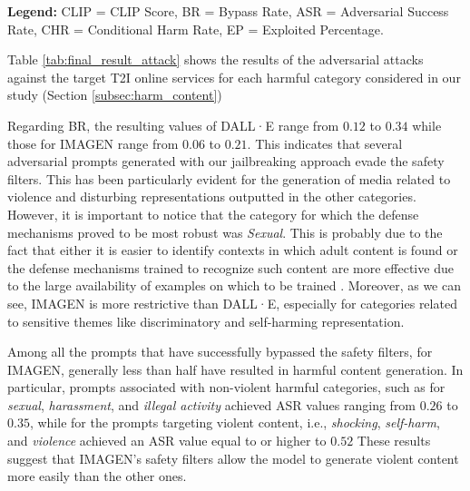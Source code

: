 \documentclass[acmsmall]{acmart}
\newcommand{\dalle}{DALL·E\xspace}
\newcommand{\imagen}{IMAGEN\xspace}
\begin{document}
{\begin{table}[b!]
{ }
\begin{flushleft}
\scriptsize \textbf{Legend:} CLIP = CLIP Score, BR = Bypass Rate, ASR = Adversarial Success Rate, CHR = Conditional Harm Rate, EP = Exploited Percentage.
\end{flushleft}
\caption{Attack metrics for \dalle and \imagen. The table reports the Bypass Rate (BR), Adversarial Success Rate (ASR), Conditional Harm Rate (CHR), CLIP Score, and Exploited Percentage (EP) for each harmful content category.}
\label{tab:final_result_attack}
\end{table}
Table \ref{tab:final_result_attack} shows the results of the adversarial attacks against the target T2I online services for each harmful category considered in our study (Section \ref{subsec:harm_content})

Regarding BR, the resulting values of \dalle range from $0.12$ to $0.34$ while those for \imagen range from $0.06$ to $0.21$. This indicates that several adversarial prompts generated with our jailbreaking approach evade the safety filters. This has been particularly evident for the generation of media related to violence and disturbing representations outputted in the other categories. However, it is important to notice that the category for which the defense mechanisms proved to be most robust was \textit{Sexual}. This is probably due to the fact that either it is easier to identify contexts in which adult content is found or the defense mechanisms trained to recognize such content are more effective due to the large availability of examples on which to be trained \cite{brahim2024predictors}. Moreover, as we can see, \imagen is more restrictive than \dalle, especially for categories related to sensitive themes like discriminatory and self-harming representation.

Among all the prompts that have successfully bypassed the safety filters, for \imagen, generally less than half have resulted in harmful content generation. In particular, prompts associated with non-violent harmful categories, such as for \textit{sexual}, \textit{harassment}, and \textit{illegal activity} achieved ASR values ranging from $0.26$ to $0.35$, while for the prompts targeting violent content, i.e., \textit{shocking}, \textit{self-harm}, and \textit{violence} achieved an ASR value equal to or higher to $0.52$
These results suggest that \imagen's safety filters allow the model to generate violent content more easily than the other ones.

}
\end{document}
